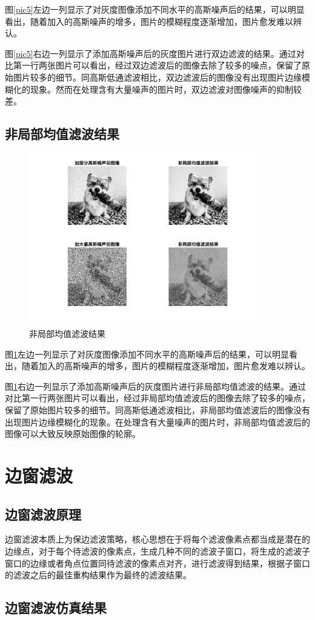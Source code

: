 \documentclass[conference]{IEEEtran}
\begin{document}
图\ref{pic5}左边一列显示了对灰度图像添加不同水平的高斯噪声后的结果，可以明显看出，随着加入的高斯噪声的增多，图片的模糊程度逐渐增加，图片愈发难以辨认。

图\ref{pic5}右边一列显示了添加高斯噪声后的灰度图片进行双边滤波的结果。通过对比第一行两张图片可以看出，经过双边滤波后的图像去除了较多的噪点，保留了原始图片较多的细节。同高斯低通滤波相比，双边滤波后的图像没有出现图片边缘模糊化的现象。然而在处理含有大量噪声的图片时，双边滤波对图像噪声的抑制较差。

\subsection{非局部均值滤波结果}
\begin{figure}[htbp]
	\centerline{
		\includegraphics[width=10cm]{NLM滤波结果.png} 	
	}
	\caption{非局部均值滤波结果}
	\label{pic6}
\end{figure}

图\ref{pic6}左边一列显示了对灰度图像添加不同水平的高斯噪声后的结果，可以明显看出，随着加入的高斯噪声的增多，图片的模糊程度逐渐增加，图片愈发难以辨认。

图\ref{pic6}右边一列显示了添加高斯噪声后的灰度图片进行非局部均值滤波的结果。通过对比第一行两张图片可以看出，经过非局部均值滤波后的图像去除了较多的噪点，保留了原始图片较多的细节。同高斯低通滤波相比，非局部均值滤波后的图像没有出现图片边缘模糊化的现象。在处理含有大量噪声的图片时，非局部均值滤波后的图像可以大致反映原始图像的轮廓。

\section{边窗滤波}
\subsection{边窗滤波原理}
边窗滤波本质上为保边滤波策略，核心思想在于将每个滤波像素点都当成是潜在的边缘点，对于每个待滤波的像素点，生成几种不同的滤波子窗口，将生成的滤波子窗口的边缘或者角点位置同待滤波的像素点对齐，进行滤波得到结果，根据子窗口的滤波之后的最佳重构结果作为最终的滤波结果。

\subsection{边窗滤波仿真结果}
\end{document}
